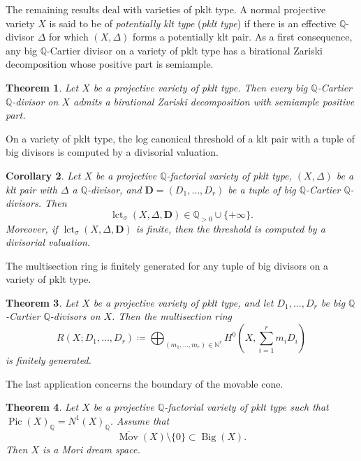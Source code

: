 \documentclass[a4paper,12pt]{amsart}
\newtheorem{theorem}{Theorem}[section]
\theoremstyle{plain}
\newtheorem{corollary}[theorem]{Corollary}
\theoremstyle{definition}
\numberwithin{equation}{section}
\newcommand{\N}{\mathbb{N}}
\newcommand{\Q}{\mathbb{Q}}
\DeclareMathOperator{\Bigdiv}{Big}
\def\Pic{\operatorname{Pic}}
\def\Mov{\operatorname{Mov}}
\def\lct{\operatorname{lct}}
\begin{document}
The remaining results deal with varieties of pklt type. A normal projective variety \(X\) is said to be of \emph{potentially klt type} (\emph{pklt type}) if there is an effective \(\Q\)-divisor \(\Delta\) for which \((X,\Delta)\) forms a potentially klt pair. As a first consequence, any big $\Q$-Cartier divisor on a variety of pklt type has a birational Zariski decomposition whose positive part is semiample.

\begin{theorem}\label{thm:BZD}
    Let $X$ be a projective variety of pklt type. Then every big $\Q$-Cartier $\Q$-divisor on $X$ admits a birational Zariski decomposition with semiample positive part.
\end{theorem}

On a variety of pklt type, the log canonical threshold of a klt pair with a tuple of big divisors is computed by a divisorial valuation.

\begin{corollary}\label{cor:divisorial}
    Let \(X\) be a projective \(\Q\)-factorial variety of pklt type, \((X,\Delta)\) be a klt pair with $\Delta$ a $\Q$-divisor, and \(\mathbf{D}=(D_1,\dots,D_r)\) be a tuple of big \(\Q\)-Cartier \(\Q\)-divisors. Then
    \[
    \lct_{\sigma}(X,\Delta,\mathbf{D})\in \Q_{>0}\cup \{+\infty\}.
    \]
    Moreover, if $\lct_{\sigma}(X,\Delta,\mathbf{D})$ is finite, then the threshold is computed by a divisorial valuation.
\end{corollary}

The multisection ring is finitely generated for any tuple of big divisors on a variety of pklt type.

\begin{theorem}\label{thm:fg}
Let $X$ be a projective variety of pklt type, and let $D_1,\dots,D_r$ be big $\Q$-Cartier \(\Q\)-divisors on $X$. Then the multisection ring
\[
R(X;D_1,\dots,D_r)
\coloneqq
\bigoplus_{(m_1,\dots,m_r)\in\N^r}
H^0\!\left(X,\sum_{i=1}^r m_iD_i\right)
\]
is finitely generated.
\end{theorem}

The last application concerns the boundary of the movable cone.

\begin{theorem}\label{thm:Mov cone}
Let $X$ be a projective $\Q$-factorial variety of pklt type such that $\Pic(X)_{\Q}=N^1(X)_{\Q}$. Assume that
\[
\overline{\Mov}(X)\setminus\{0\}\subset\Bigdiv(X).
\]
Then $X$ is a Mori dream space. 
\end{theorem}
\end{document}
